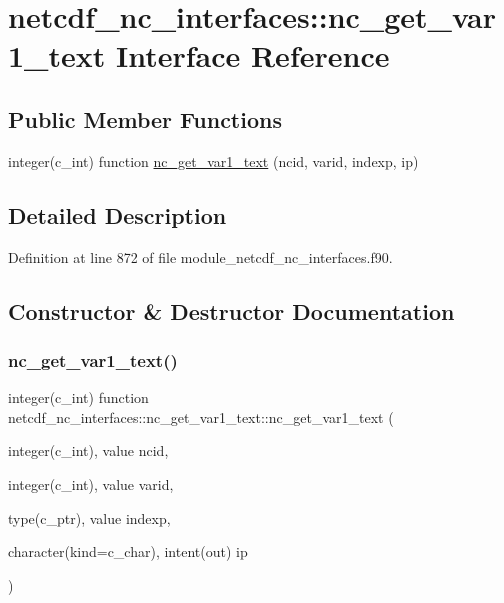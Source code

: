 \hypertarget{interfacenetcdf__nc__interfaces_1_1nc__get__var1__text}{}\section{netcdf\+\_\+nc\+\_\+interfaces\+:\+:nc\+\_\+get\+\_\+var1\+\_\+text Interface Reference}
\label{interfacenetcdf__nc__interfaces_1_1nc__get__var1__text}
\subsection*{Public Member Functions}
\begin{DoxyCompactItemize}
\item 
integer(c\+\_\+int) function \hyperlink{interfacenetcdf__nc__interfaces_1_1nc__get__var1__text_aecb2c68dcf5eee0ca913dba530e93489}{nc\+\_\+get\+\_\+var1\+\_\+text} (ncid, varid, indexp, ip)
\end{DoxyCompactItemize}


\subsection{Detailed Description}


Definition at line 872 of file module\+\_\+netcdf\+\_\+nc\+\_\+interfaces.\+f90.



\subsection{Constructor \& Destructor Documentation}
\mbox{\label{interfacenetcdf__nc__interfaces_1_1nc__get__var1__text_aecb2c68dcf5eee0ca913dba530e93489}} 
\subsubsection{\texorpdfstring{nc\+\_\+get\+\_\+var1\+\_\+text()}{nc\_get\_var1\_text()}}
{\footnotesize\ttfamily integer(c\+\_\+int) function netcdf\+\_\+nc\+\_\+interfaces\+::nc\+\_\+get\+\_\+var1\+\_\+text\+::nc\+\_\+get\+\_\+var1\+\_\+text (\begin{DoxyParamCaption}\item[{integer(c\+\_\+int), value}]{ncid,  }\item[{integer(c\+\_\+int), value}]{varid,  }\item[{type(c\+\_\+ptr), value}]{indexp,  }\item[{character(kind=c\+\_\+char), intent(out)}]{ip }\end{DoxyParamCaption})}



